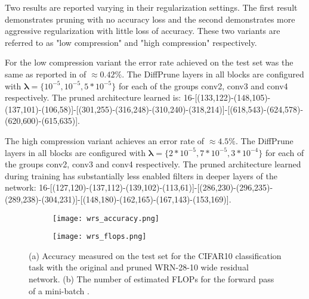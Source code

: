 \documentclass[final,1p,times]{elsarticle}
\begin{document}
Two results are reported varying in their regularization settings. The first result demonstrates pruning with no accuracy loss and the second demonstrates more aggressive regularization with little loss of accuracy. These two variants are referred to as "low compression" and "high compression" respectively.

For the low compression variant the error rate achieved on the test set was the same as reported in \cite{BMVC2016_87} of $\approx0.42\%$. The DiffPrune layers in all blocks are configured with $\boldsymbol{\lambda} = \{ 10^{-5}, 10^{-5}, 5 * 10^{-5} \}$ for each of the groups conv2, conv3 and conv4 respectively. The pruned architecture learned is: 16-[(133,122)-(148,105)-(137,101)-(106,58)]-[(301,255)-(316,248)-(310,240)-(318,214)]-[(618,543)-(624,578)-(620,600)-(615,635)].

The high compression variant achieves an error rate of $\approx4.5\%$. The DiffPrune layers in all blocks are configured with $\boldsymbol{\lambda} = \{ 2 * 10^{-5}, 7 * 10^{-5}, 3 * 10^{-4} \}$ for each of the groups conv2, conv3 and conv4 respectively. The pruned architecture learned during training has substantially less enabled filters in deeper layers of the network: 16-[(127,120)-(137,112)-(139,102)-(113,61)]-[(286,230)-(296,235)-(289,238)-(304,231)]-[(148,180)-(162,165)-(167,143)-(153,169)].

\begin{figure}[h!]
\centering
\begin{subfigure}{.5\textwidth}
    \centering
    \texttt{[image: wrs\_accuracy.png]}
    \caption{}
\end{subfigure}\begin{subfigure}{.5\textwidth}
    \centering
    \texttt{[image: wrs\_flops.png]}
    \caption{}
\end{subfigure}
\caption[short]{(a) Accuracy measured on the test set for the CIFAR10 classification task with the original and pruned WRN-28-10 wide residual network. (b) The number of estimated FLOPs for the forward pass of a mini-batch .}
\label{fig:wrn_plots}
\end{figure}
\end{document}
